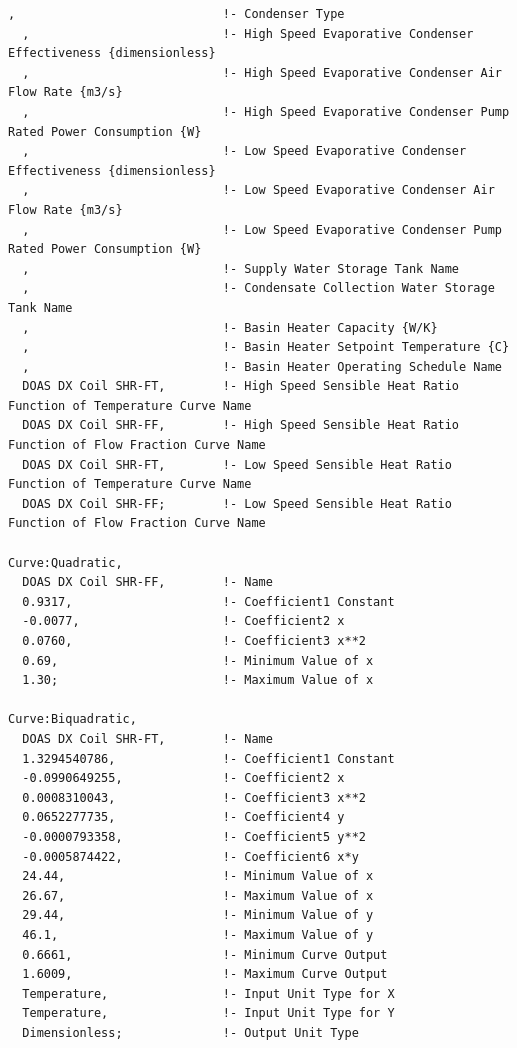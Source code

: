 \begin{lstlisting}
,                             !- Condenser Type
  ,                           !- High Speed Evaporative Condenser Effectiveness {dimensionless}
  ,                           !- High Speed Evaporative Condenser Air Flow Rate {m3/s}
  ,                           !- High Speed Evaporative Condenser Pump Rated Power Consumption {W}
  ,                           !- Low Speed Evaporative Condenser Effectiveness {dimensionless}
  ,                           !- Low Speed Evaporative Condenser Air Flow Rate {m3/s}
  ,                           !- Low Speed Evaporative Condenser Pump Rated Power Consumption {W}
  ,                           !- Supply Water Storage Tank Name
  ,                           !- Condensate Collection Water Storage Tank Name
  ,                           !- Basin Heater Capacity {W/K}
  ,                           !- Basin Heater Setpoint Temperature {C}
  ,                           !- Basin Heater Operating Schedule Name
  DOAS DX Coil SHR-FT,        !- High Speed Sensible Heat Ratio Function of Temperature Curve Name
  DOAS DX Coil SHR-FF,        !- High Speed Sensible Heat Ratio Function of Flow Fraction Curve Name
  DOAS DX Coil SHR-FT,        !- Low Speed Sensible Heat Ratio Function of Temperature Curve Name
  DOAS DX Coil SHR-FF;        !- Low Speed Sensible Heat Ratio Function of Flow Fraction Curve Name

Curve:Quadratic,
  DOAS DX Coil SHR-FF,        !- Name
  0.9317,                     !- Coefficient1 Constant
  -0.0077,                    !- Coefficient2 x
  0.0760,                     !- Coefficient3 x**2
  0.69,                       !- Minimum Value of x
  1.30;                       !- Maximum Value of x

Curve:Biquadratic,
  DOAS DX Coil SHR-FT,        !- Name
  1.3294540786,               !- Coefficient1 Constant
  -0.0990649255,              !- Coefficient2 x
  0.0008310043,               !- Coefficient3 x**2
  0.0652277735,               !- Coefficient4 y
  -0.0000793358,              !- Coefficient5 y**2
  -0.0005874422,              !- Coefficient6 x*y
  24.44,                      !- Minimum Value of x
  26.67,                      !- Maximum Value of x
  29.44,                      !- Minimum Value of y
  46.1,                       !- Maximum Value of y
  0.6661,                     !- Minimum Curve Output
  1.6009,                     !- Maximum Curve Output
  Temperature,                !- Input Unit Type for X
  Temperature,                !- Input Unit Type for Y
  Dimensionless;              !- Output Unit Type
\end{lstlisting}

